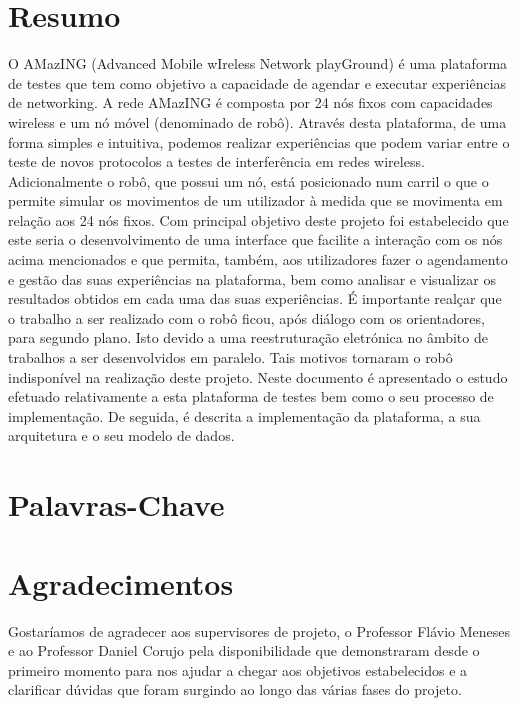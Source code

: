 \chapter{Resumo}
O AMazING  (Advanced Mobile wIreless Network playGround) é uma plataforma de testes que tem como objetivo a capacidade de agendar e executar experiências de networking. A rede AMazING é composta por 24 nós fixos com capacidades wireless e um nó móvel (denominado de robô). \newline
Através desta plataforma, de uma forma simples e intuitiva, podemos realizar experiências que podem variar entre o teste de novos protocolos a testes de interferência em redes wireless. Adicionalmente o robô, que possui um nó, está posicionado num carril o que o permite simular os movimentos de um utilizador à medida que se  movimenta em relação aos 24 nós fixos. \newline
Com principal objetivo deste projeto foi estabelecido que este seria o desenvolvimento de uma interface que facilite a interação com os nós acima mencionados e que permita, também, aos utilizadores fazer o agendamento e gestão das suas experiências na plataforma, bem como analisar e visualizar os resultados obtidos em cada uma das suas experiências. É importante realçar que o trabalho a ser realizado com o robô ficou, após diálogo com os orientadores, para segundo plano. Isto devido a uma reestruturação eletrónica no âmbito de trabalhos a ser desenvolvidos em paralelo. Tais motivos tornaram o robô indisponível na realização deste projeto.
Neste documento é apresentado o estudo efetuado relativamente a esta plataforma de testes bem como o seu processo de implementação. De seguida, é descrita a implementação da plataforma, a sua arquitetura e o seu modelo de dados.


\chapter{Palavras-Chave}
\begin{acronym}[Keys]
\end{acronym}

\chapter{Agradecimentos}
Gostaríamos de agradecer aos supervisores de projeto, o Professor Flávio Meneses e ao Professor Daniel Corujo pela disponibilidade que demonstraram desde o primeiro momento para nos  ajudar a chegar aos objetivos estabelecidos e a clarificar dúvidas que foram surgindo ao longo das várias fases do projeto.
